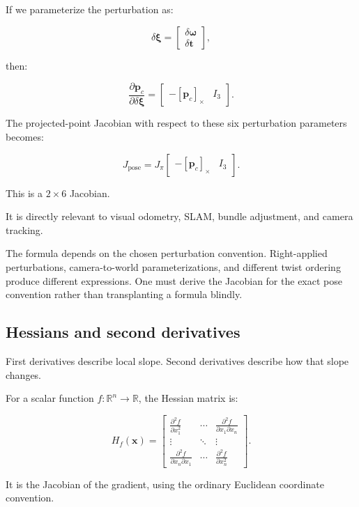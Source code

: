 If we parameterize the perturbation as:

\[
\delta\boldsymbol\xi= \begin{bmatrix} \delta\boldsymbol\omega\\ \delta\mathbf t \end{bmatrix},
\]

then:

\[
\frac{\partial\mathbf p_c} {\partial\delta\boldsymbol\xi} = \begin{bmatrix} -[\mathbf p_c]_\times&I_3 \end{bmatrix}.
\]

The projected-point Jacobian with respect to these six perturbation parameters becomes:

\[
\boxed{ J_{\text{pose}} = J_\pi \begin{bmatrix} -[\mathbf p_c]_\times&I_3 \end{bmatrix} }.
\]

This is a \(2\times6\) Jacobian.

It is directly relevant to visual odometry, SLAM, bundle adjustment, and camera tracking.

The formula depends on the chosen perturbation convention. Right-applied perturbations, camera-to-world parameterizations, and different twist ordering produce different expressions. One must derive the Jacobian for the exact pose convention rather than transplanting a formula blindly.

\subsection{Hessians and second derivatives}\label{02-foundations-ii-ch021-hessians-and-second-derivatives}

First derivatives describe local slope. Second derivatives describe how that slope changes.

For a scalar function \(f:\mathbb R^n\to\mathbb R\), the Hessian matrix is:

\[
\boxed{ H_f(\mathbf x)= \begin{bmatrix} \frac{\partial^2f}{\partial x_1^2} & \cdots & \frac{\partial^2f}{\partial x_1\partial x_n} \\ \vdots&\ddots&\vdots\\ \frac{\partial^2f}{\partial x_n\partial x_1} & \cdots & \frac{\partial^2f}{\partial x_n^2} \end{bmatrix} }.
\]

It is the Jacobian of the gradient, using the ordinary Euclidean coordinate convention.

